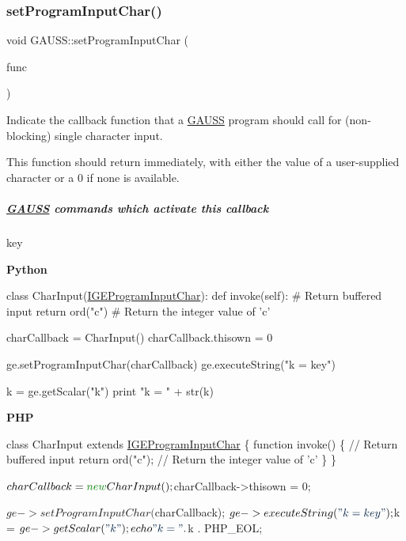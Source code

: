 \subsubsection{\texorpdfstring{set\+Program\+Input\+Char()}{setProgramInputChar()}}
{\footnotesize\ttfamily void G\+A\+U\+S\+S\+::set\+Program\+Input\+Char (\begin{DoxyParamCaption}\item[{\hyperlink{class_i_g_e_program_input_char}{I\+G\+E\+Program\+Input\+Char} $\ast$}]{func }\end{DoxyParamCaption})\hspace{0.3cm}{\ttfamily [static]}}



Indicate the callback function that a \hyperlink{class_g_a_u_s_s}{G\+A\+U\+SS} program should call for (non-\/blocking) single character input. 

This function should return immediately, with either the value of a user-\/supplied character or a 0 if none is available.

\subparagraph*{\hyperlink{class_g_a_u_s_s}{G\+A\+U\+SS} commands which activate this callback}


\begin{DoxyItemize}
\item {\ttfamily key}
\end{DoxyItemize}

{\bfseries Python} 
\begin{DoxyCode}
\textcolor{keyword}{class }CharInput(\hyperlink{class_i_g_e_program_input_char}{IGEProgramInputChar}):
    \textcolor{keyword}{def }invoke(self):
        \textcolor{comment}{# Return buffered input}
        \textcolor{keywordflow}{return} ord(\textcolor{stringliteral}{"c"}) \textcolor{comment}{# Return the integer value of 'c'}

charCallback = CharInput()
charCallback.thisown = 0

ge.setProgramInputChar(charCallback)
ge.executeString(\textcolor{stringliteral}{"k = key"})

k = ge.getScalar(\textcolor{stringliteral}{"k"})
\textcolor{keywordflow}{print} \textcolor{stringliteral}{"k = "} + str(k)
\end{DoxyCode}


{\bfseries P\+HP} 
\begin{DoxyCode}
\textcolor{keyword}{class }CharInput \textcolor{keyword}{extends} \hyperlink{class_i_g_e_program_input_char}{IGEProgramInputChar} \{
    \textcolor{keyword}{function} invoke() \{
        \textcolor{comment}{// Return buffered input}
        \textcolor{keywordflow}{return} ord(\textcolor{stringliteral}{"c"}); \textcolor{comment}{// Return the integer value of 'c'}
    \}
\}

$charCallback = \textcolor{keyword}{new} CharInput();
$charCallback->thisown = 0;

$ge->setProgramInputChar($charCallback);
$ge->executeString(\textcolor{stringliteral}{"k = key"});

$k = $ge->getScalar(\textcolor{stringliteral}{"k"});
echo \textcolor{stringliteral}{"k = "} . $k . PHP\_EOL;
\end{DoxyCode}



